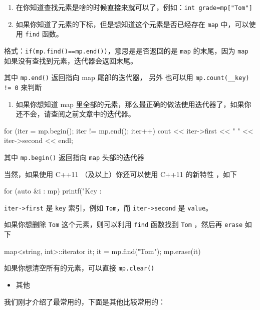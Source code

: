 \begin{enumerate}
\item 在你知道查找元素是啥的时候直接来就可以了，例如：\texttt{int grade=mp["Tom"]}
\item 如果你知道了元素的下标，但是想知道这个元素是否已经存在 \texttt{map} 中，可以使用 \texttt{find} 函数。
\end{enumerate}

格式：\texttt{if(mp.find()==mp.end())}，意思是是否返回的是 \texttt{map} 的末尾，因为 \texttt{map} 如果没有查找到元素，迭代器会返回末尾。

其中 \texttt{mp.end()} 返回指向 map 尾部的迭代器， 另外 也可以用 \texttt{mp.count(__key) != 0} 来判断

\begin{enumerate}
\item 如果你想知道 map 里全部的元素，那么最正确的做法使用迭代器了，如果你还不会，请查阅之前文章中的迭代器。
\end{enumerate}

\begin{cppcode}
for (iter = mp.begin(); iter != mp.end(); iter++)
  cout << iter->first << " " << iter->second << endl;
\end{cppcode}

其中 \texttt{mp.begin()} 返回指向 \texttt{map} 头部的迭代器

当然，如果使用 C++11 （及以上）你还可以使用 C++11 的新特性 ，如下

\begin{cppcode}
for (auto &i : mp) {
  printf("Key : %
}
\end{cppcode}

\texttt{iter->first} 是 \texttt{key} 索引，例如 \texttt{Tom}，而 \texttt{iter->second} 是 \texttt{value}。

如果你想删除 \texttt{Tom} 这个元素，则可以利用 \texttt{find} 函数找到 \texttt{Tom} ，然后再 \texttt{erase} 如下

\begin{cppcode}
map<string, int>::iterator it;
it = mp.find("Tom");
mp.erase(it)
\end{cppcode}

如果你想清空所有的元素，可以直接 \texttt{mp.clear()}

\begin{itemize}
\item 其他
\end{itemize}

我们刚才介绍了最常用的，下面是其他比较常用的：

